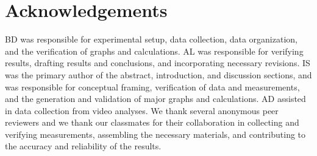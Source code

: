 \documentclass[reprint,amsmath,amssymb,aps,twoside]{revtex4-2} %
\begin{document}
\section{Acknowledgements}
BD was responsible for experimental setup, data collection, data organization, and the verification of graphs and calculations. AL was responsible for verifying results, drafting results and conclusions, and incorporating necessary revisions. IS was the primary author of the abstract, introduction, and discussion sections, and was responsible for conceptual framing, verification of data and measurements, and the generation and validation of major graphs and calculations. AD assisted in data collection from video analyses. We thank several anonymous peer reviewers and we thank our classmates for their collaboration in collecting and verifying measurements, assembling the necessary materials, and contributing to the accuracy and reliability of the results.









%
%
%

%
%
%
%
%
%
\end{document}
